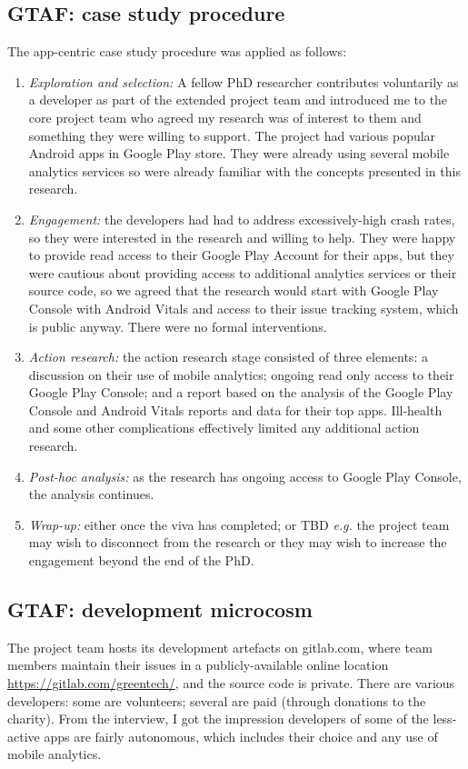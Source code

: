 \subsection{GTAF: case study procedure}
The app-centric case study procedure was applied as follows:
{\small
\begin{enumerate}
    \itemsep0em
    \item \textit{Exploration and selection:} A fellow PhD researcher contributes voluntarily as a developer as part of the extended project team and introduced me to the core project team who agreed my research was of interest to them and something they were willing to support. The project had various popular Android apps in Google Play store. They were already using several mobile analytics services so were already familiar with the concepts presented in this research.
    \item \textit{Engagement:} the developers had had to address excessively-high crash rates, so they were interested in the research and willing to help. They were happy to provide read access to their Google Play Account for their apps, but they were cautious about providing access to additional analytics services or their source code, so we agreed that the research would start with Google Play Console with Android Vitals and access to their issue tracking system, which is public anyway.  There were no formal interventions.
    \item \textit{Action research:} the action research stage consisted of three elements: a discussion on their use of mobile analytics; ongoing read only access to their Google Play Console; and a report based on the analysis of the Google Play Console and Android Vitals reports and data for their top apps. Ill-health and some other complications effectively limited any additional action research. 
    \item \textit{Post-hoc analysis:} as the research has ongoing access to Google Play Console, the analysis continues.
    \item \textit{Wrap-up:} either once the viva has completed; or TBD \textit{e.g.} the project team may wish to disconnect from the research or they may wish to increase the engagement beyond the end of the PhD.
\end{enumerate}
}


\subsection{GTAF: development microcosm} 
The project team hosts its development artefacts on gitlab.com, where team members maintain their issues in a publicly-available online location \url{https://gitlab.com/greentech/}, and the source code is private. There are various developers: some are volunteers; several are paid (through donations to the charity). From the interview, I got the impression developers of some of the less-active apps are fairly autonomous, which includes their choice and any use of mobile analytics. 

